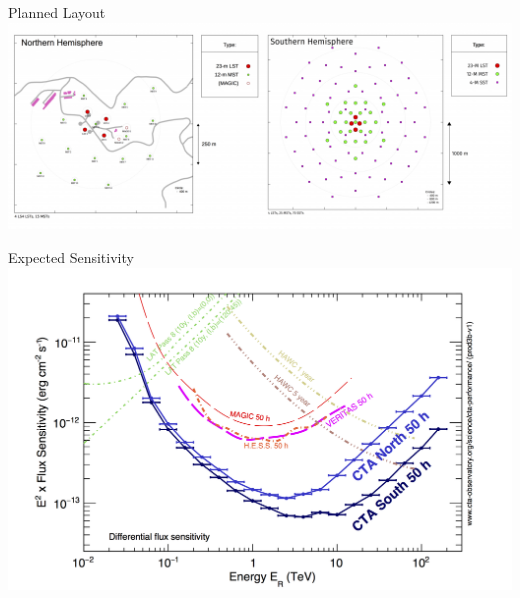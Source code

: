 \begin{frame}{Planned Layout \cite{cta_sensitivity}}
\centering
        \includegraphics[width=0.9\linewidth]{images/cta_layout.png}
\end{frame}


\begin{frame}{Expected Sensitivity \cite{cta_sensitivity}}
\centering
        \includegraphics[width=0.75\linewidth]{images/cta_sensitivity.png}
\end{frame}

